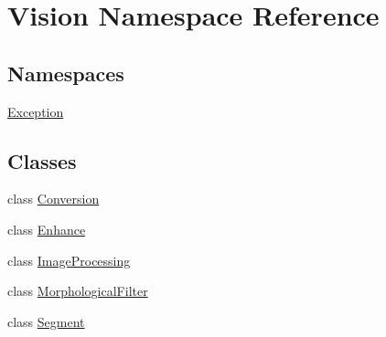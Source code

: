 \hypertarget{namespace_vision}{}\section{Vision Namespace Reference}
\label{namespace_vision}
\subsection*{Namespaces}
\begin{DoxyCompactItemize}
\item 
 \hyperlink{namespace_vision_1_1_exception}{Exception}
\end{DoxyCompactItemize}
\subsection*{Classes}
\begin{DoxyCompactItemize}
\item 
class \hyperlink{class_vision_1_1_conversion}{Conversion}
\item 
class \hyperlink{class_vision_1_1_enhance}{Enhance}
\item 
class \hyperlink{class_vision_1_1_image_processing}{Image\+Processing}
\item 
class \hyperlink{class_vision_1_1_morphological_filter}{Morphological\+Filter}
\item 
class \hyperlink{class_vision_1_1_segment}{Segment}
\end{DoxyCompactItemize}
